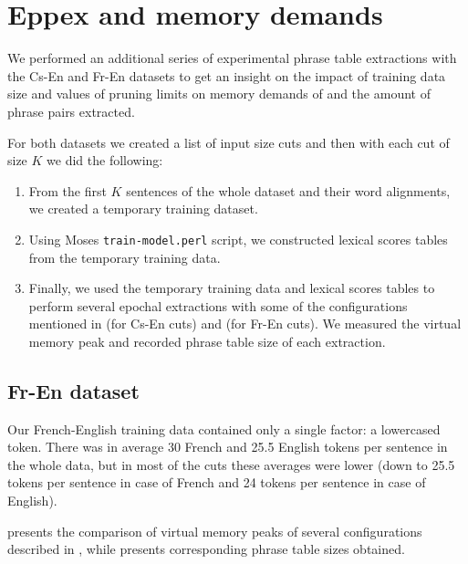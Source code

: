 \section{Eppex and memory demands}
\label{sec:eppex-memory-demands}

We performed an additional series of experimental phrase table extractions with
the Cs-En and Fr-En datasets to get an insight on the impact of training data size and
values of pruning limits on memory demands of \eppex{} and the amount of phrase pairs
extracted.

For both datasets we created a list of input size cuts and then with each cut of size $K$
we did the following:
\begin{enumerate}
  \item From the first $K$ sentences of the whole dataset and their word alignments, we
    created a temporary training dataset.
  \item Using Moses \texttt{train-model.perl} script, we constructed lexical scores tables
    from the temporary training data.
  \item Finally, we used the temporary training data and lexical scores tables to perform several epochal
    extractions with some of the configurations mentioned in
     (for Cs-En cuts) and  (for Fr-En cuts).
    We measured the virtual memory peak and recorded phrase table size of each extraction.
\end{enumerate}

\subsection{Fr-En dataset}

Our French-English training data contained only a single factor: a lowercased token.
There was in average 30 French and 25.5 English tokens per sentence in the whole data,
but in most of the cuts these averages were lower (down to 25.5 tokens per sentence
in case of French and 24 tokens per sentence in case of English).

 presents the comparison of virtual memory peaks
of several \eppex{} configurations described in , while
 presents corresponding phrase table sizes obtained.

